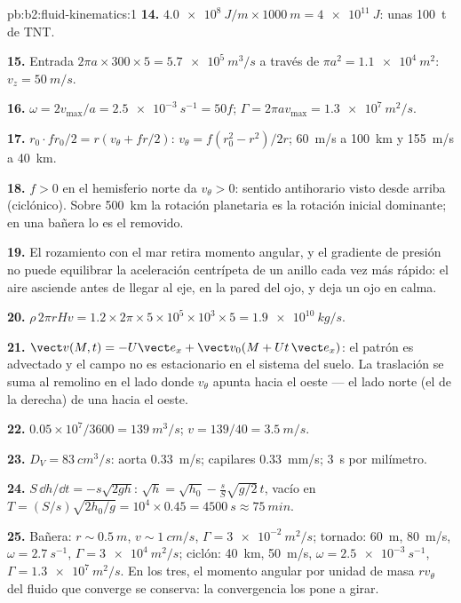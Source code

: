 \begin{solution}{pb:b2:fluid-kinematics:1}
\textbf{14.} $\qty{4.0e8}{J/m} \times \qty{1000}{m} = \qty{4e11}{J}$: unas
\qty{100}{t} de TNT.

\textbf{15.} Entrada $2\pi a \times 300 \times 5 = \qty{5.7e5}{m^3/s}$ a través de
$\pi a^2 = \qty{1.1e4}{m^2}$: $v_z = \qty{50}{m/s}$.

\textbf{16.} $\omega = 2v_{\max}/a = \qty{2.5e-3}{s^{-1}} = 50f$; $\Gamma = 2\pi av_{\max}
= \qty{1.3e7}{m^2/s}$.

\textbf{17.} $r_0\cdot fr_0/2 = r(v_\theta + fr/2)$: $v_\theta = f(r_0^2 - r^2)/2r$;
\qty{60}{m/s} a \qty{100}{km} y \qty{155}{m/s} a \qty{40}{km}.

\textbf{18.} $f > 0$ en el hemisferio norte da $v_\theta > 0$: sentido
antihorario visto desde arriba (ciclónico). Sobre \qty{500}{km} la rotación
planetaria es la rotación inicial dominante; en una bañera lo es el
removido.

\textbf{19.} El rozamiento con el mar retira momento angular, y el
gradiente de presión no puede equilibrar la aceleración centrípeta de un
anillo cada vez más rápido: el aire asciende antes de llegar al eje, en la
pared del ojo, y deja un ojo en calma.

\textbf{20.} $\rho\,2\pi rHv = 1.2 \times 2\pi \times 5 \times 10^5 \times 10^3 \times 5 =
\qty{1.9e10}{kg/s}$.

\textbf{21.} $\vect v(M, t) = -U\vect e_x + \vect v_0(M + Ut\,\vect e_x)$: el
patrón es advectado y el campo no es estacionario en el sistema del suelo.
La traslación se suma al remolino en el lado donde $v_\theta$ apunta hacia
el oeste --- el lado norte (el de la derecha) de una  hacia el oeste.

\textbf{22.} $0.05 \times 10^7/3600 = \qty{139}{m^3/s}$; $v = 139/40 = \qty{3.5}{m/s}$.

\textbf{23.} $D_V = \qty{83}{cm^3/s}$: aorta \qty{0.33}{m/s}; capilares
\qty{0.33}{mm/s}; \qty{3}{s} por milímetro.

\textbf{24.} $S\,\dd h/\dd t = -s\sqrt{2gh}$: $\sqrt h = \sqrt{h_0} -
\frac sS\sqrt{g/2}\,t$, vacío en $T = (S/s)\sqrt{2h_0/g} = 10^4 \times 0.45 =
\qty{4500}{s} \approx \qty{75}{min}$.

\textbf{25.} Bañera: $r \sim \qty{0.5}{m}$, $v \sim \qty{1}{cm/s}$, $\Gamma =
\qty{3e-2}{m^2/s}$; tornado: \qty{60}{m}, \qty{80}{m/s}, $\omega = \qty{2.7}{s^{-1}}$,
$\Gamma = \qty{3e4}{m^2/s}$; ciclón: \qty{40}{km}, \qty{50}{m/s}, $\omega =
\qty{2.5e-3}{s^{-1}}$, $\Gamma = \qty{1.3e7}{m^2/s}$. En los tres, el momento
angular por unidad de masa $rv_\theta$ del fluido que converge se conserva:
la convergencia los pone a girar.
\end{solution}
